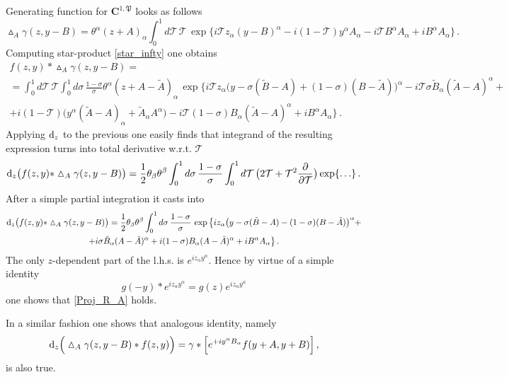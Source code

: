 \documentclass[12pt]{article}
\newcommand{\dr}{{{\rm d}}}
\newcommand{\hmt}{\vartriangle}
\begin{document}
Generating function for $\mathbf{C}^{1,\mathfrak{P}}$ looks as follows
\begin{equation}
\hmt_A \gamma(z,y-B)=\theta^\alpha(z+A)_\alpha \int_0^1 d\mathcal{T}\, \mathcal{T} \, \exp\{i\mathcal{T}z_\alpha (y-B)^\alpha-i(1-\mathcal{T})y^\alpha A_\alpha-i\mathcal{T}B^\alpha A_\alpha+iB^\alpha A_\alpha\}\,.
\end{equation} 
Computing star-product \eqref{star_infty} one obtains
\begin{multline}
f(z,y)\ast \hmt_A\gamma(z,y-B)=\\
=\int_0^1d\mathcal{T}\,\mathcal{T}\int_0^1d\sigma\,\frac{1-\sigma}{\sigma}\theta^\alpha (z+A-\tilde{A})_\alpha\, \exp\Big\{i\mathcal{T}z_\alpha\big(y-\sigma(\tilde{B}-A)+(1-\sigma)(B-\tilde{A})\big)^\alpha-i\mathcal{T}\sigma \tilde{B}_\alpha(\tilde{A}-A)^\alpha+\\
+i(1-\mathcal{T})\big(y^\alpha(\tilde{A}-A)_\alpha+\tilde{A}_\alpha A^\alpha\big)-i\mathcal{T}(1-\sigma)B_\alpha(\tilde{A}-A)^\alpha+iB^\alpha A_\alpha\Big\}\,.
\end{multline}
Applying $\dr_z$ to the previous one easily finds that integrand of the resulting expression turns into total derivative w.r.t. $\mathcal{T}$
\begin{equation}
\dr_z\big(f(z,y)\ast \hmt_A\gamma(z,y-B)\big)=\frac{1}{2}\theta_\beta \theta^\beta\int_0^1 d\sigma\, \frac{1-\sigma}{\sigma}\int_0^1d\mathcal{T}\,\big(2\mathcal{T}+\mathcal{T}^2\frac{\partial}{\partial \mathcal{T}}\big)\exp\{\ldots\}\,.
\end{equation}
After a simple partial integration it casts into
\begin{multline}
\dr_z\big(f(z,y)\ast \hmt_A\gamma(z,y-B)\big)=\frac{1}{2}\theta_\beta \theta^\beta \int_0^1 d\sigma\, \frac{1-\sigma}{\sigma}\, \exp\big\{iz_\alpha\big(y-\sigma(\tilde{B}-A)-(1-\sigma)(B-\tilde{A})\big)^\alpha+\\+i\sigma \tilde{B}_\alpha(A-\tilde{A})^\alpha+i(1-\sigma)B_\alpha(A-\tilde{A})^\alpha+iB^\alpha A_\alpha\big\}\,.
\end{multline}
The only $z$-dependent part of the l.h.s. is $e^{iz_\alpha y^\alpha}$. Hence by virtue of a simple identity
\begin{equation}
g(-y)\ast e^{iz_\alpha y^\alpha}=g(z)e^{iz_\alpha y^\alpha}
\end{equation}
one shows that \eqref{Proj_R_A} holds. 

In a similar fashion one shows that analogous identity, namely
\begin{equation}\label{Proj_L_A}
\dr_z\Big(\hmt_A\gamma(z,y-B)\ast f(z,y)\Big)=\gamma\ast \Big[e^{+iy^\alpha B_\alpha} f(y+A,y+B)\Big]\,,
\end{equation}
is also true. 
\end{document}
